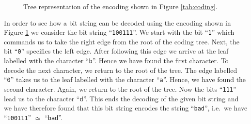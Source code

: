\begin{figure}[!ht]
  \centering
  \caption{Tree representation of the encoding shown in Figure \ref{tab:coding}.}
  \label{fig:coding-tree}
\end{figure}
In order to see how a bit string can be decoded using the encoding shown in Figure \ref{fig:coding-tree}
we consider the bit string ``\texttt{100111}''.  We start with the bit ``\texttt{1}'' which commands us to take
the right edge from the root of the coding tree.  Next, the bit ``\texttt{0}'' specifies the left edge.  
After following this edge we arrive at the leaf labelled with the character ``\texttt{b}''.  Hence we have
found the first character.  To decode the next character, we return to the root of the tree.  The edge labelled
``\texttt{0}'' takes us to the leaf labelled with the character ``\texttt{a}''.  Hence, we have found the
second character.  Again, we return to the root of the tree.  Now the bits ``\texttt{111}'' lead us to the
character ``\texttt{d}''.  This ends the decoding of the given bit string and we have therefore found that this
bit string encodes the string ``\texttt{bad}'', i.e.~we have
\\[0.2cm]
\hspace*{1.3cm}
``\texttt{100111}'' $\simeq$ ``\texttt{bad}''.


